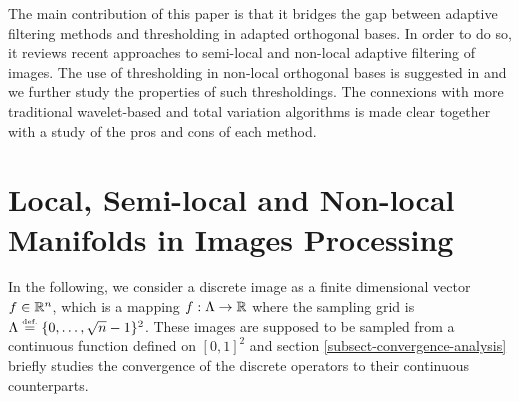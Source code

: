 \documentclass[final]{siamltex}
\begin{document}
The main contribution of this paper is that it bridges the gap between adaptive filtering methods and thresholding in adapted orthogonal bases. In order to do so, it reviews recent approaches to semi-local and non-local adaptive filtering of images. The use of thresholding in non-local orthogonal bases is suggested in \cite{szlam-regularization} and we further study the properties of such thresholdings. The connexions with more traditional wavelet-based and total variation algorithms is made clear together with a study of the pros and cons of each method. 


 
 
 
\section{Local, Semi-local and Non-local Manifolds in Images Processing}



In the following, we consider a discrete image as a finite dimensional vector $f \in \mathbb{R}^n$, which is a mapping $f : \Lambda \rightarrow \mathbb{R}$ where the sampling grid is $\Lambda\stackrel{\mbox{\upshape\tiny def.}}{=} \{0,\ldots,\sqrt{n}-1\}^2$. These images are supposed to be sampled from a continuous function defined on $[0,1]^2$ and section \ref{subsect-convergence-analysis} briefly studies the convergence of the discrete operators to their continuous counterparts. 
\end{document}
